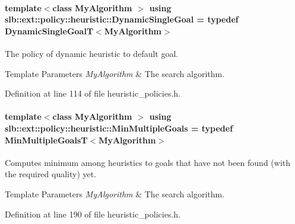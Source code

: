 \paragraph[{\texorpdfstring{Dynamic\+Single\+Goal}{DynamicSingleGoal}}]{\setlength{\rightskip}{0pt plus 5cm}template$<$class My\+Algorithm $>$ using {\bf slb\+::ext\+::policy\+::heuristic\+::\+Dynamic\+Single\+Goal} = typedef {\bf Dynamic\+Single\+GoalT}$<$My\+Algorithm$>$}\hypertarget{namespaceslb_1_1ext_1_1policy_1_1heuristic_abd4d8d1b33c56751ff726b83181b0609}{}\label{namespaceslb_1_1ext_1_1policy_1_1heuristic_abd4d8d1b33c56751ff726b83181b0609}


The policy of dynamic heuristic to default goal. 


\begin{DoxyTemplParams}{Template Parameters}
{\em My\+Algorithm} & The search algorithm. \\
\hline
\end{DoxyTemplParams}


Definition at line 114 of file heuristic\+\_\+policies.\+h.

\paragraph[{\texorpdfstring{Min\+Multiple\+Goals}{MinMultipleGoals}}]{\setlength{\rightskip}{0pt plus 5cm}template$<$class My\+Algorithm $>$ using {\bf slb\+::ext\+::policy\+::heuristic\+::\+Min\+Multiple\+Goals} = typedef {\bf Min\+Multiple\+GoalsT}$<$My\+Algorithm$>$}\hypertarget{namespaceslb_1_1ext_1_1policy_1_1heuristic_adb60983019024c0557fb57be8feab48c}{}\label{namespaceslb_1_1ext_1_1policy_1_1heuristic_adb60983019024c0557fb57be8feab48c}


Computes minimum among heuristics to goals that have not been found (with the required quality) yet. 


\begin{DoxyTemplParams}{Template Parameters}
{\em My\+Algorithm} & The search algorithm. \\
\hline
\end{DoxyTemplParams}


Definition at line 190 of file heuristic\+\_\+policies.\+h.

